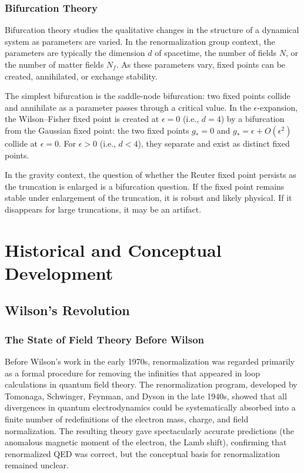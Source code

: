 \documentclass[11pt, twoside, openright]{book}
\theoremstyle{dotted}
\theoremstyle{definition}
\begin{document}
\section{Bifurcation Theory}

Bifurcation theory studies the qualitative changes in the structure of a dynamical
system as parameters are varied. In the renormalization group context, the
parameters are typically the dimension $d$ of spacetime, the number of fields $N$,
or the number of matter fields $N_f$. As these parameters vary, fixed points can
be created, annihilated, or exchange stability.

The simplest bifurcation is the saddle-node bifurcation: two fixed points collide
and annihilate as a parameter passes through a critical value. In the
$\epsilon$-expansion, the Wilson--Fisher fixed point is created at $\epsilon = 0$
(i.e., $d = 4$) by a bifurcation from the Gaussian fixed point: the two fixed points
$g_* = 0$ and $g_* = \epsilon + O(\epsilon^2)$ collide at $\epsilon = 0$. For
$\epsilon > 0$ (i.e., $d < 4$), they separate and exist as distinct fixed points.

In the gravity context, the question of whether the Reuter fixed point persists
as the truncation is enlarged is a bifurcation question. If the fixed point
remains stable under enlargement of the truncation, it is robust and likely
physical. If it disappears for large truncations, it may be an artifact.

\part{Historical and Conceptual Development}

\chapter{Wilson's Revolution}
\label{ch:wilson_revolution}

\section{The State of Field Theory Before Wilson}

Before Wilson's work in the early 1970s, renormalization was regarded primarily
as a formal procedure for removing the infinities that appeared in loop calculations
in quantum field theory. The renormalization program, developed by Tomonaga,
Schwinger, Feynman, and Dyson in the late 1940s, showed that all divergences in
quantum electrodynamics could be systematically absorbed into a finite number of
redefinitions of the electron mass, charge, and field normalization. The resulting
theory gave spectacularly accurate predictions (the anomalous magnetic moment of
the electron, the Lamb shift), confirming that renormalized QED was correct, but
the conceptual basis for renormalization remained unclear.
\end{document}
